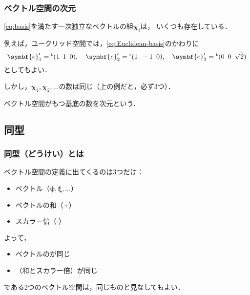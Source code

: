 \documentclass[
    10pt,
    ]{sotsu-beamer}
\begin{document}
\begin{frame}
    \frametitle{ベクトル空間の次元}

    \eqref{eq:basis}を満たす一次独立なベクトルの組$\symbf{\chi}_i$は，
    いくつも存在している．

    例えば，ユークリッド空間では，\eqref{eq:Euclidean-basis}のかわりに
    \begin{equation*}
        \symbf{e}'_1 = \cvector{1 ; 1 ; 0}, \quad 
        \symbf{e}'_2 = \cvector{1 ; {-1} ; 0}, \quad
        \symbf{e}'_3 = \cvector{0 ; 0 ; \sqrt{2}}
    \end{equation*}
    としてもよい．

    しかし，$\symbf{\chi}_1, \symbf{\chi}_2, \dotsc$の数は同じ（上の例だと，必ず3つ）．

    ベクトル空間がもつ基底の数を\alert{次元}という．


\end{frame}


\subsection{同型}


\begin{frame}
    \frametitle{同型（どうけい）とは}

    ベクトル空間の定義に出てくるのは3つだけ：
    \begin{itemize}
        \item ベクトル（$\symbf{\psi}, \symbf{\xi}, \dotsc$）
        \item ベクトルの和（$+$）
        \item スカラー倍（$\cdotp$）
    \end{itemize}

    \pause

    よって，
    \begin{itemize}
        \item ベクトルのが同じ
        \item {}（和とスカラー倍）が同じ
    \end{itemize}
    である2つのベクトル空間は，同じものと見なしてもよい．
    
\end{frame}
\end{document}
